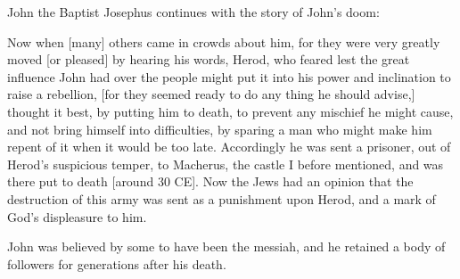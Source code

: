 \documentclass[10pt,twoside]{article} %
\newcommand{\quotesize}{\normalsize{}}
\newcommand{\comm}[1]{\begingroup \color{black!50} #1\endgroup}
\newenvironment{quotetext}{\begingroup\quotesize}{\endgroup}
\begin{document}
\begin{section}{John the Baptist}
\comm{
Josephus continues with the story of John's doom:
}\label{john-the-baptist-death}

\begin{quotetext}
Now when [many] others came in crowds about him, for
they were very greatly moved [or pleased] by hearing his words, Herod,
who feared lest the great influence John had over the people might put
it into his power and inclination to raise a rebellion, [for they
seemed ready to do any thing he should advise,] thought it best, by
putting him to death, to prevent any mischief he might cause, and not
bring himself into difficulties, by sparing a man who might make him
repent of it when it would be too late. Accordingly he was sent a
prisoner, out of Herod's suspicious temper, to Macherus, the castle I
before mentioned, and was there put to death [around 30 CE]. Now the Jews had an
opinion that the destruction of this army was sent as a punishment
upon Herod, and a mark of God's displeasure to him.
\end{quotetext}

\comm{
John was believed by some to have been the messiah, and he retained a body of followers for
generations after his death.
}


\end{section}
\end{document}
